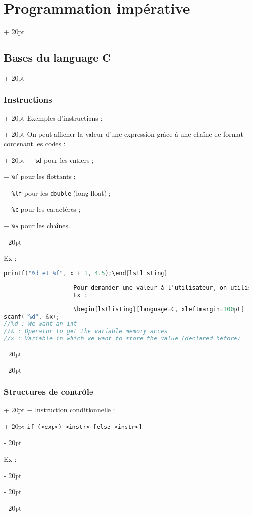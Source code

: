 \documentclass[a4paper, 12pt, twoside]{article}
\newcommand{\ind}[1][20pt]{\advance\leftskip + #1}
\newcommand{\deind}[1][20pt]{\advance\leftskip - #1}
\newcommand{\indented}[2][20pt]{\par \ind[#1] #2 \par \deind[#1]}
\newenvironment{indentedenv}[1][20pt]{\par \ind[#1]}{\par \deind}
\newenvironment{indt}[2][20pt]{#2 \begin{indentedenv}[#1]}{\end{indentedenv}} %
\begin{document}
\begin{indt}{\section{Programmation impérative}}
\begin{indt}{\subsection{Bases du language C}}
\begin{indt}{\subsubsection{Instructions}}
\begin{indt}{Exemples d'instructions :}
                    \begin{indt}{On peut afficher la valeur d'une expression grâce à une chaîne de format contenant les codes :}
                        $-$ \texttt{\%d} pour les entiers ;
                        
                        $-$ \texttt{\%f} pour les flottants ;
                        
                        $-$ \texttt{\%lf} pour les \texttt{double} (long float) ;
                        
                        $-$ \texttt{\%c} pour les caractères ;
                        
                        $-$ \texttt{\%s} pour les chaînes.
                    \end{indt}
                    
                    Ex :
                    
                    \begin{lstlisting}[language=C, xleftmargin=100pt]
printf("%d et %f", x + 1, 4.5);\end{lstlisting}
                    
                    Pour demander une valeur à l'utilisateur, on utilise la fonction \texttt{scanf} avec la chaîne de format adaptée.
                    Ex :
                    
                    \begin{lstlisting}[language=C, xleftmargin=100pt]
scanf("%d", &x);
//%d : We want an int
//& : Operator to get the variable memory acces
//x : Variable in which we want to store the value (declared before)
                    \end{lstlisting}
                    
                \end{indt}
            \end{indt}
            
            \vspace{12pt}
            
            \begin{indt}{\subsubsection{Structures de contrôle}}
                $-$ Instruction conditionnelle :
                \indented{\texttt{if (<exp>) <instr> [else <instr>]}}
                
                Ex :
                    

\end{indt}
\end{indt}
\end{indt}
\end{document}
